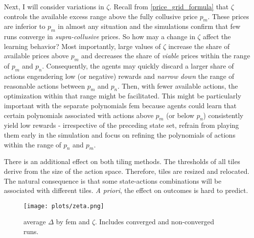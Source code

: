 Next, I will consider variations in $\zeta$. Recall from \autoref{price_grid_formula} that $\zeta$ controls the available excess range above the fully collusive price $p_m$. These prices are inferior to $p_m$ in almost any situation and the simulations confirm that few runs converge in \emph{supra-collusive} prices. So how may a change in $\zeta$ affect the learning behavior? Most importantly, large values of $\zeta$ increase the share of available prices above $p_m$ and decreases the share of \emph{viable} prices within the range of $p_m$ and $p_n$. Consequently, the agents may quickly discard a larger share of actions engendering low (or negative) rewards and \emph{narrow down} the range of reasonable actions between $p_m$ and $p_n$. Then, with fewer available actions, the optimization within that range might be facilitated. This might be particularly important with the separate polynomials \gls{fem} because agents could learn that certain polynomials associated with actions above $p_m$ (or below $p_n$) consistently yield low rewards - irrespective of the preceding state set, refrain from playing them early in the simulation and focus on refining the polynomials of actions within the range of $p_n$ and $p_m$.

There is an additional effect on both tiling methods. The thresholds of all tiles derive from the size of the action space. Therefore, tiles are resized and relocated. The natural consequence is that some state-actions combinations will be associated with different tiles. \emph{A priori}, the effect on outcomes is hard to predict.

\begin{figure}
	\texttt{[image: plots/zeta.png]}
	\caption[average $\Delta$ by \gls{fem} and $\zeta$]{average $\Delta$ by \gls{fem} and $\zeta$. Includes converged and non-converged runs.}
	\label{zeta}
\end{figure}

